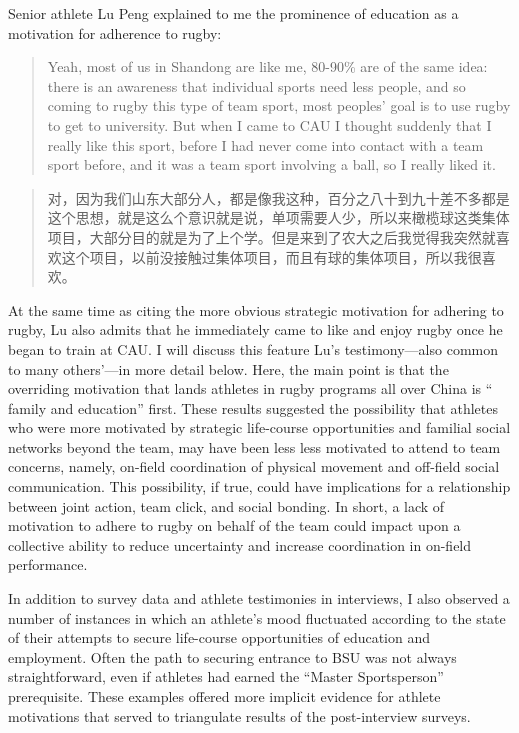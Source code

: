 \begin{CJK}{UTF8}{gbsn}
Senior athlete Lu Peng explained to me the prominence of education as a motivation for adherence to rugby:
      \begin{quote}
          Yeah, most of us in Shandong are like me, 80-90\% are of the same idea: there is an awareness that individual sports need less people, and so coming to rugby this type of team sport, most peoples' goal is to use rugby to get to university.  But when I came to CAU I thought suddenly that I really like this sport, before I had never come into contact with a team sport before, and it was a team sport involving a ball, so I really liked it.
      \end{quote}
      \begin{quote}
           对，因为我们山东大部分人，都是像我这种，百分之八十到九十差不多都是这个思想，就是这么个意识就是说，单项需要人少，所以来橄榄球这类集体项目，大部分目的就是为了上个学。但是来到了农大之后我觉得我突然就喜欢这个项目，以前没接触过集体项目，而且有球的集体项目，所以我很喜欢。
      \end{quote}
At the same time as citing the more obvious strategic motivation for adhering to rugby, Lu also admits that he immediately came to like and enjoy rugby once he began to train at CAU. I will discuss this feature Lu's testimony—also common to many others'---in more detail below.  Here, the main point is that the overriding motivation that lands athletes in rugby programs all over China is `` family and education'' first.
These results suggested the possibility that athletes who were more motivated by strategic life-course opportunities and familial social networks beyond the team, may have been less less motivated to attend to team concerns, namely, on-field coordination of physical movement and off-field social communication.  This possibility, if true, could have implications for a relationship between joint action, team click, and social bonding. In short, a lack of motivation to adhere to rugby on behalf of the team could impact upon a collective ability to reduce uncertainty and increase coordination in on-field performance.

In addition to survey data and athlete testimonies in interviews, I also observed a number of instances in which an athlete's mood fluctuated according to the state of their attempts to secure life-course opportunities of education and employment.  Often the path to securing entrance to BSU was not always straightforward, even if athletes had earned the ``Master Sportsperson'' prerequisite. These examples offered more implicit evidence for athlete motivations that served to triangulate results of the post-interview surveys.


\end{CJK}
